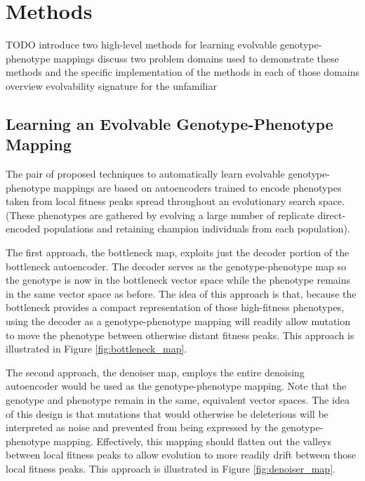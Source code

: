 \section{Methods} \label{sec:methods}

TODO
introduce two high-level methods for learning evolvable genotype-phenotype mappings
discuss two problem domains used to demonstrate these methods and the specific implementation of the methods in each of those domains
overview evolvability signature for the unfamiliar

\subsection{Learning an Evolvable Genotype-Phenotype Mapping}

The pair of proposed techniques to automatically learn evolvable genotype-phenotype mappings are based on autoencoders trained to encode phenotypes taken from local fitness peaks spread throughout an evolutionary search space.
(These phenotypes are gathered by evolving a large number of replicate direct-encoded populations and retaining champion individuals from each population).



The first approach, the bottleneck map, exploits just the decoder portion of the bottleneck autoencoder.
The decoder serves as the genotype-phenotype map so the genotype is now in the bottleneck vector space while the phenotype remains in the same vector space as before.
The idea of this approach is that, because the bottleneck provides a compact representation of those high-fitness phenotypes, using the decoder as a genotype-phenotype mapping will readily allow mutation to move the phenotype between otherwise distant fitness peaks.
This approach is illustrated in Figure \ref{fig:bottleneck_map}.



The second approach, the denoiser map, employs the entire denoising autoencoder would be used as the genotype-phenotype mapping.
Note that the genotype and phenotype remain in the same, equivalent vector spaces.
The idea of this design is that mutations that would otherwise be deleterious will be interpreted as noise and prevented from being expressed by the genotype-phenotype mapping.
Effectively, this mapping should flatten out the valleys between local fitness peaks to allow evolution to more readily drift between those local fitness peaks.
This approach is illustrated in Figure \ref{fig:denoiser_map}.


